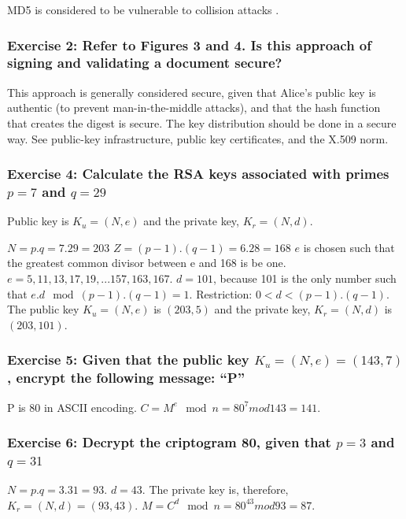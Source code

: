 \documentclass[12pt,a4paper]{article}
\begin{document}
MD5 is considered to be vulnerable to collision attacks \cite{wang2005}.


\subsubsection*{Exercise 2: Refer to Figures 3 and 4. Is this approach of signing and validating a document secure?}

This approach is generally considered secure, given that Alice's public key is authentic (to prevent man-in-the-middle attacks), and that the hash function that creates the digest is secure. The key distribution should be done in a secure way. See public-key infrastructure, public key certificates, and the X.509 norm. 

\subsubsection*{Exercise 4: Calculate the RSA keys associated with primes $p = 7$ and $q = 29$}
Public key is $K_u = (N,e)$ and the private key, $K_r = (N,d)$.

$N = p.q = 7.29 = 203$
$Z = (p - 1).(q - 1) = 6.28 = 168$
$e$ is chosen such that the greatest common divisor between e and 168 is be one. 
$e = 5, 11, 13, 17, 19, ... 157, 163, 167$.
$d = 101$, because 101 is the only number such that $e.d \mod (p - 1).(q - 1) = 1$. Restriction: $0 < d < (p - 1).(q - 1)$.
The public key $K_u = (N,e)$ is $(203, 5)$ and the private key, $K_r = (N,d)$ is $(203,101)$.

\subsubsection*{Exercise 5: Given that the public key $K_u = (N,e) = (143, 7)$, encrypt the following message: ``P''}
P is 80 in ASCII encoding.
$C = M^e \mod n = 80^7 mod 143 = 141$.

\subsubsection*{Exercise 6: Decrypt the criptogram 80, given that $p = 3$ and $q = 31$ }
$N = p.q = 3.31 = 93$.
$d = 43$.
The private key is, therefore, $K_r = (N,d) = (93,43)$.
$M = C^d \mod n = 80^43 mod 93 = 87$.





\end{document}
